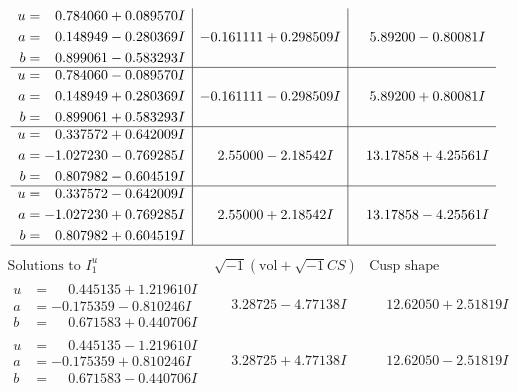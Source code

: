 \documentclass[1p]{elsarticle_modified}
\theoremstyle{definition}
\newcommand{\I}{\sqrt{-1}}
\begin{document}
$$\begin{array}{c|c|c}
\begin{aligned}
u &= \phantom{-}0.784060 + 0.089570 I \\
a &= \phantom{-}0.148949 - 0.280369 I \\
b &= \phantom{-}0.899061 - 0.583293 I\end{aligned}
 & -0.161111 + 0.298509 I & \phantom{-}5.89200 - 0.80081 I \\ \hline\begin{aligned}
u &= \phantom{-}0.784060 - 0.089570 I \\
a &= \phantom{-}0.148949 + 0.280369 I \\
b &= \phantom{-}0.899061 + 0.583293 I\end{aligned}
 & -0.161111 - 0.298509 I & \phantom{-}5.89200 + 0.80081 I \\ \hline\begin{aligned}
u &= \phantom{-}0.337572 + 0.642009 I \\
a &= -1.027230 - 0.769285 I \\
b &= \phantom{-}0.807982 - 0.604519 I\end{aligned}
 & \phantom{-}2.55000 - 2.18542 I & \phantom{-}13.17858 + 4.25561 I \\ \hline\begin{aligned}
u &= \phantom{-}0.337572 - 0.642009 I \\
a &= -1.027230 + 0.769285 I \\
b &= \phantom{-}0.807982 + 0.604519 I\end{aligned}
 & \phantom{-}2.55000 + 2.18542 I & \phantom{-}13.17858 - 4.25561 I\\
 \hline 
 \end{array}$$\newpage$$\begin{array}{c|c|c}  
\text{Solutions to }I^u_{1}& \I (\text{vol} + \sqrt{-1}CS) & \text{Cusp shape}\\
 \hline 
\begin{aligned}
u &= \phantom{-}0.445135 + 1.219610 I \\
a &= -0.175359 - 0.810246 I \\
b &= \phantom{-}0.671583 + 0.440706 I\end{aligned}
 & \phantom{-}3.28725 - 4.77138 I & \phantom{-}12.62050 + 2.51819 I \\ \hline\begin{aligned}
u &= \phantom{-}0.445135 - 1.219610 I \\
a &= -0.175359 + 0.810246 I \\
b &= \phantom{-}0.671583 - 0.440706 I\end{aligned}
 & \phantom{-}3.28725 + 4.77138 I & \phantom{-}12.62050 - 2.51819 I \\ \hline\begin{aligned}

\end{aligned}
\end{array}$$
\end{document}
